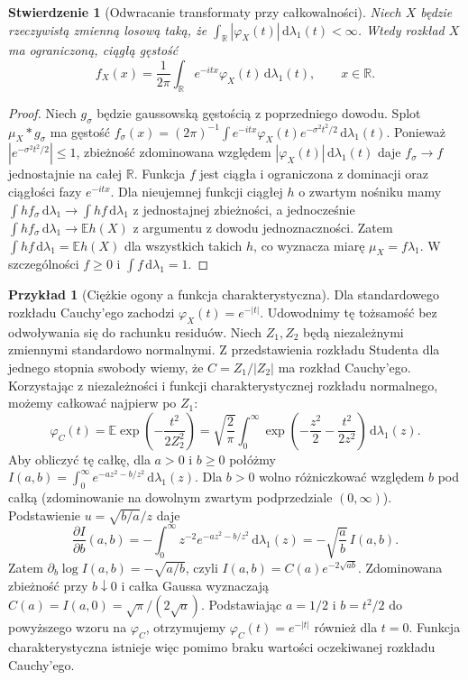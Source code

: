 \documentclass[11pt,a4paper,oneside]{report}
\numberwithin{equation}{chapter}
\theoremstyle{plain}
\newtheorem{stwierdzenie}[twierdzenie]{Stwierdzenie}
\theoremstyle{definition}
\newtheorem{przyklad}{Przykład}[chapter]
\theoremstyle{remark}
\newcommand{\R}{\mathbb{R}}
\newcommand{\E}{\mathbb{E}}
\newcommand{\dd}{\mathrm{d}}
\begin{document}
\begin{stwierdzenie}[Odwracanie transformaty przy całkowalności]
Niech $X$ będzie rzeczywistą zmienną losową taką,
że $\int_\R|\varphi_X(t)|\,\dd\lambda_1(t)<\infty$.
Wtedy rozkład $X$ ma ograniczoną, ciągłą gęstość
\[
f_X(x)=\frac1{2\pi}\int_\R e^{-itx}\varphi_X(t)
\,\dd\lambda_1(t),\qquad x\in\R.
\]
\end{stwierdzenie}
\begin{proof}
Niech $g_\sigma$ będzie gaussowską gęstością z
poprzedniego dowodu. Splot $\mu_X*g_\sigma$ ma gęstość
$f_\sigma(x)=(2\pi)^{-1}\int e^{-itx}\varphi_X(t)
 e^{-\sigma^2t^2/2}\,\dd\lambda_1(t)$.
Ponieważ $|e^{-\sigma^2t^2/2}|\leq1$, zbieżność zdominowana
względem $|\varphi_X(t)|\,\dd\lambda_1(t)$ daje
$f_\sigma\to f$ jednostajnie na całej $\R$.
Funkcja $f$ jest ciągła i ograniczona z dominacji
oraz ciągłości fazy $e^{-itx}$.
Dla nieujemnej funkcji ciągłej $h$ o zwartym nośniku
mamy $\int h f_\sigma\,\dd\lambda_1\to
\int h f\,\dd\lambda_1$ z jednostajnej zbieżności,
a jednocześnie $\int h f_\sigma\,\dd\lambda_1\to\E h(X)$
z argumentu z dowodu jednoznaczności.
Zatem $\int h f\,\dd\lambda_1=\E h(X)$
dla wszystkich takich $h$, co wyznacza miarę
$\mu_X=f\lambda_1$. W szczególności $f\geq0$
i $\int f\,\dd\lambda_1=1$.
\end{proof}

\begin{przyklad}[Ciężkie ogony a funkcja charakterystyczna]
Dla standardowego rozkładu Cauchy'ego zachodzi
$\varphi_X(t)=e^{-|t|}$. Udowodnimy tę tożsamość
bez odwoływania się do rachunku residuów.
Niech $Z_1,Z_2$ będą niezależnymi zmiennymi standardowo
normalnymi. Z przedstawienia rozkładu Studenta dla
jednego stopnia swobody wiemy, że $C=Z_1/|Z_2|$
ma rozkład Cauchy'ego. Korzystając z niezależności
i funkcji charakterystycznej rozkładu normalnego,
możemy całkować najpierw po $Z_1$:
\[
\varphi_C(t)=\E\exp\!\left(-\frac{t^2}{2Z_2^2}\right)
=\sqrt{\frac2\pi}\int_0^\infty
\exp\!\left(-\frac{z^2}{2}-\frac{t^2}{2z^2}\right)
\,\dd\lambda_1(z).
\]
Aby obliczyć tę całkę, dla $a>0$ i $b\geq0$ połóżmy
$I(a,b)=\int_0^\infty e^{-az^2-b/z^2}\,\dd\lambda_1(z)$.
Dla $b>0$ wolno różniczkować względem $b$ pod całką
(zdominowanie na dowolnym zwartym podprzedziale
$(0,\infty)$). Podstawienie $u=\sqrt{b/a}/z$ daje
\[
\frac{\partial I}{\partial b}(a,b)
=-\int_0^\infty z^{-2}e^{-az^2-b/z^2}\,\dd\lambda_1(z)
=-\sqrt{\frac ab}\,I(a,b).
\]
Zatem $\partial_b\log I(a,b)=-\sqrt{a/b}$,
czyli $I(a,b)=C(a)e^{-2\sqrt{ab}}$.
Zdominowana zbieżność przy $b\downarrow0$ i całka
Gaussa wyznaczają $C(a)=I(a,0)=\sqrt\pi/(2\sqrt a)$.
Podstawiając $a=1/2$ i $b=t^2/2$ do powyższego
wzoru na $\varphi_C$, otrzymujemy
$\varphi_C(t)=e^{-|t|}$ również dla $t=0$.
Funkcja charakterystyczna istnieje więc pomimo braku
wartości oczekiwanej rozkładu Cauchy'ego.
\end{przyklad}
\end{document}
